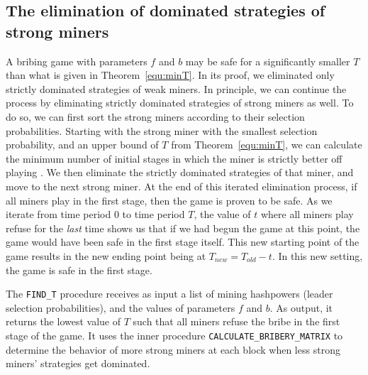 \subsection{The elimination of dominated strategies of strong miners}
A bribing game with parameters $f$ and $b$ may be safe for a significantly smaller $T$ than what is given in Theorem~\ref{equ:minT}. In its proof, we eliminated only strictly dominated strategies of weak miners. In principle, we can continue the process by eliminating strictly dominated strategies of strong miners as well. To do so, we can first sort the strong miners according to their selection probabilities. Starting with the strong miner with the smallest selection probability, and an upper bound of $T$ from Theorem~\ref{equ:minT}, we can calculate the minimum number of initial stages in which the miner is strictly better off playing . We then eliminate the strictly dominated strategies of that miner, and move to the next strong miner. At the end of this iterated elimination process, if all miners play  in the first stage, then the game is proven to be safe. As we iterate from time period 0 to time period $T$, the value of $t$ where all miners play refuse for the \textit{last} time shows us that if we had begun the game at this point, the game would have been safe in the first stage itself. This new starting point of the game results in the new ending point being at $T_{new} = T_{old} - t$. In this new setting, the game is safe in the first stage. 

The \texttt{FIND\_T} procedure receives as input a list of mining hashpowers (leader selection probabilities), and the values of parameters $f$ and $b$. As output, it returns the lowest value of $T$ such that all miners refuse the bribe in the first stage of the game. It uses the inner procedure \texttt{CALCULATE\_BRIBERY\_MATRIX} to determine the behavior of more strong miners at each block when less strong miners' strategies get dominated.

